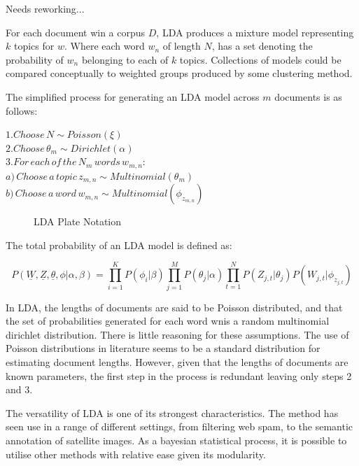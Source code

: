 \documentclass[10pt]{report}
\begin{document}
{\hspace*{40mm}Needs reworking...}

For each document win a corpus \(D\), LDA produces a mixture model representing  \(k\) topics for \(w\). Where each word \(w_n\) of length \(N\), has a set denoting the probability of \(w_n\) belonging to each of \(k\) topics. Collections of models could be compared conceptually to weighted groups produced by some clustering method.

\renewcommand{\baselinestretch}{1.5}\normalsize
The simplified process for generating an LDA model across \(m\) documents is as follows:

\renewcommand{\baselinestretch}{1.0}\normalsize
\(1. Choose\, N \sim Poisson(\xi)\)\\
\(2. Choose\, \theta_m \sim Dirichlet(\alpha)\)\\
\(3. For\, each\, of\, the\, N_m\, words\, w_{m,n}:\)\\
{\hspace*{15mm} \(a)\, Choose\, a\, topic\, z_{m,n} \sim Multinomial(\theta_m)  \)}\\
{\hspace*{15mm} \(b)\, Choose\, a\, word\, w_{m,n} \sim Multinomial(\phi_{z_{m,n}}) \)}\\

\begin{figure}[h]
  \caption{LDA Plate Notation\label{fig:lda_plate_notation}}
\end{figure}
\renewcommand{\baselinestretch}{2.0}\normalsize

\renewcommand{\baselinestretch}{1.0}\normalsize
The total probability of an LDA model is defined as:

\[
  P(\underline{W},\underline{Z},\underline{\theta},\phi|\alpha,\beta) = \prod^{K}_{i=1} P(\phi_i|\beta) \prod^{M}_{j=1} P(\theta_j|\alpha)\prod^{N}_{t=1} P(Z_{j,t} | \theta_j)P(W_{j,t} | \phi_{z_{j,t}})
\]

\renewcommand{\baselinestretch}{2.0}\normalsize
In LDA, the lengths of documents are said to be Poisson distributed, and that the set of probabilities  generated for each word wnis a random multinomial dirichlet distribution. There is little reasoning for these assumptions. The use of Poisson distributions in literature seems to be a standard distribution for estimating document lengths. However, given that the lengths of documents are known parameters, the first step in the process is redundant leaving only steps 2 and 3.

The versatility of LDA is one of its strongest characteristics. The method has seen use in a range of different settings, from filtering web spam, to the semantic annotation of satellite images. As a bayesian statistical process, it is possible to utilise other methods with relative ease given its modularity.
\end{document}
